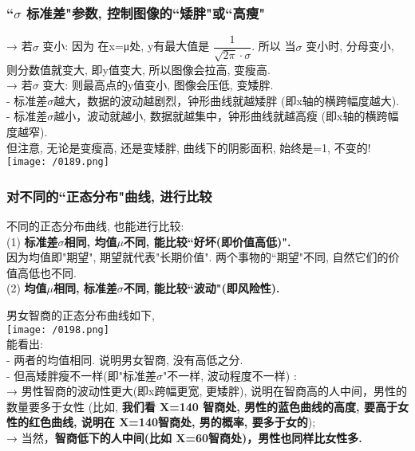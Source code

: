 \documentclass[UTF8]{ctexart}
\begin{document}
\subsubsection{``$\sigma$ 标准差"参数, 控制图像的``矮胖"或``高瘦"}

→ 若$\sigma$ 变小: 因为 在x=μ处, y有最大值是 $ \dfrac{1} {\sqrt{2π} \cdot \sigma}$. 所以 当$\sigma$ 变小时, 分母变小, 则分数值就变大, 即y值变大, 所以图像会拉高, 变瘦高. \\
→ 若$\sigma$ 变大: 则最高点的y值变小, 图像会压低, 变矮胖. \\

- 标准差$\sigma$越大，数据的波动越剧烈，钟形曲线就越矮胖 (即x轴的横跨幅度越大). \\
- 标准差$\sigma$越小，波动就越小, 数据就越集中，钟形曲线就越高瘦 (即x轴的横跨幅度越窄). \\


但注意, 无论是变瘦高, 还是变矮胖, 曲线下的阴影面积, 始终是=1, 不变的! \\

\texttt{[image: /0189.png]} 




\subsubsection{对不同的``正态分布"曲线, 进行比较}

不同的正态分布曲线, 也能进行比较: \\

(1) \textbf{标准差$\sigma$相同, 均值$\mu$不同, 能比较``好坏(即价值高低)".} \\
因为均值即"期望", 期望就代表"长期价值". 两个事物的``期望"不同, 自然它们的价值高低也不同. \\




(2) \textbf{均值$\mu$相同, 标准差$\sigma$不同, 能比较``波动"(即风险性).}  

\begin{myEnvSample}
男女智商的正态分布曲线如下, \\
\texttt{[image: /0198.png]} \\

能看出: \\
- 两者的均值相同. 说明男女智商, 没有高低之分. \\
- 但高矮胖瘦不一样(即"标准差$\sigma$"不一样, 波动程度不一样) : \\
→ 男性智商的波动性更大(即x跨幅更宽, 更矮胖), 说明在智商高的人中间，男性的数量要多于女性 (比如, \textbf{我们看 X=140 智商处, 男性的蓝色曲线的高度, 要高于女性的红色曲线, 说明在 X=140智商处, 男的概率, 要多于女的});  \\
→ 当然，\textbf{智商低下的人中间(比如 X=60智商处)，男性也同样比女性多.}
\end{myEnvSample}
\vspace{1em} 
\end{document}
